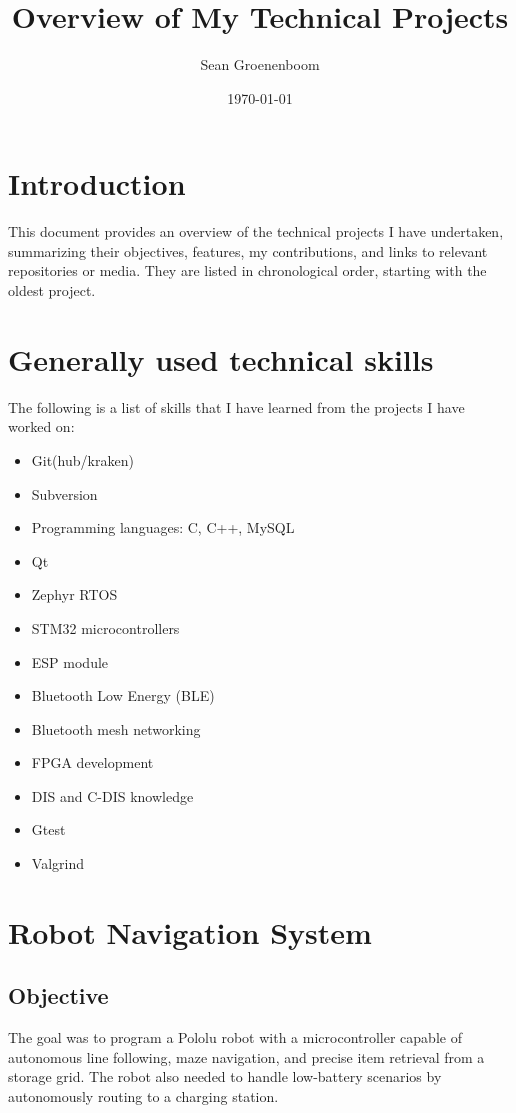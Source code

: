 \documentclass{article}
\title{Overview of My Technical Projects}
\author{Sean Groenenboom}
\date{\today}
\begin{document}
\maketitle

\tableofcontents

\section{Introduction}
This document provides an overview of the technical projects I have undertaken, summarizing their objectives, features, my contributions, and links to relevant repositories or media.
They are listed in chronological order, starting with the oldest project.

\section{Generally used technical skills}
The following is a list of skills that I have learned from the projects I have worked on:

\begin{itemize}
    \item Git(hub/kraken)
    \item Subversion
    \item Programming languages: C, C++, MySQL
    \item Qt
    \item Zephyr RTOS
    \item STM32 microcontrollers
    \item ESP module
    \item Bluetooth Low Energy (BLE)
    \item Bluetooth mesh networking
    \item FPGA development
    \item DIS and C-DIS knowledge
    \item Gtest
    \item Valgrind
\end{itemize}

\section{Robot Navigation System}
\subsection{Objective}
The goal was to program a Pololu robot with a microcontroller capable of autonomous line following, maze navigation, and precise item retrieval from a storage grid. The robot also needed to handle low-battery scenarios by autonomously routing to a charging station.
\end{document}
